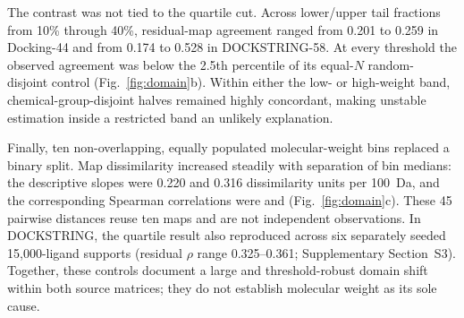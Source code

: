 \documentclass[11pt]{article}
\begin{document}
The contrast was not tied to the quartile cut. Across lower/upper tail fractions
from 10\% through 40\%, residual-map agreement ranged from 0.201 to 0.259 in
Docking-44 and from 0.174 to 0.528 in DOCKSTRING-58. At every threshold the
observed agreement was below the 2.5th percentile of its equal-$N$ random-
disjoint control (Fig.~\ref{fig:domain}b). Within either the low- or high-weight
band, chemical-group-disjoint halves remained highly concordant, making unstable
estimation inside a restricted band an unlikely explanation.

Finally, ten non-overlapping, equally populated molecular-weight bins replaced a
binary split. Map dissimilarity increased steadily with separation of bin
medians: the descriptive slopes were 0.220 and 0.316 dissimilarity units per
100~Da, and the corresponding Spearman correlations were
\DffMWContinuumRho{} and \DsMWContinuumRho{} (Fig.~\ref{fig:domain}c). These
45 pairwise distances reuse ten maps and are not independent observations. In
DOCKSTRING, the quartile result also reproduced across six separately seeded
15,000-ligand supports (residual $\rho$ range 0.325--0.361;
Supplementary Section~S3). Together, these controls document a large and
threshold-robust domain shift within both source matrices; they do not establish
molecular weight as its sole cause.
\end{document}
